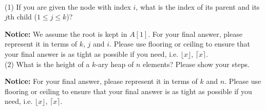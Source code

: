\documentclass{article}
\begin{document}
~\\

(1) If you are given the node with index $i$, what is the index of its parent and its $j$th child ($1 \leq j \leq k$)?

\textbf{Notice: }We assume the root is kept in $A[1]$. For your final answer, please represent it in terms of $k$, $j$ and $i$. Please use flooring or ceiling to ensure that your final answer is as tight as possible if you need, i.e. $\lfloor x \rfloor$, $\lceil x \rceil$.
~\\




























\newpage
(2) What is the height of a $k$-ary heap of $n$ elements? Please show your steps.

\textbf{Notice: }For your final answer, please represent it in terms of $k$ and $n$. Please use flooring or ceiling to ensure that your final answer is as tight as possible if you need, i.e. $\lfloor x \rfloor$, $\lceil x \rceil$.
~\\

\end{document}
